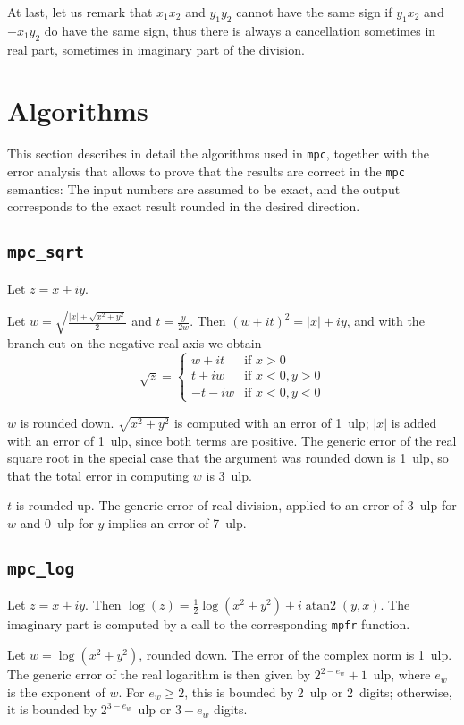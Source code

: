 \documentclass {article}
\newcommand {\mpc}{\texttt {mpc}}
\newcommand {\mpfr}{\texttt {mpfr}}
\newcommand {\ulp}[1]{#1~ulp}
\newcommand {\atantwo}{\operatorname {atan2}}
\begin{document}
At last, let us remark that $x_1x_2$ and $y_1y_2$ cannot have the same
sign if $y_1x_2$ and $-x_1y_2$ do have the same sign, thus there is
always a cancellation sometimes in real part, sometimes in imaginary
part of the division.


\section {Algorithms}

This section describes in detail the algorithms used in \mpc, together with the error analysis that allows to prove that the results are correct in the {\mpc} semantics: The input numbers are assumed to be exact, and the output corresponds to the exact result rounded in the desired direction.


\subsection {\texttt {mpc\_sqrt}}

Let $z = x + i y$.

Let $w = \sqrt { \frac {|x| + \sqrt {x^2 + y^2}}{2}}$ and
$t = \frac {y}{2w}$. Then $(w + it)^2 = |x| + iy$, and with the branch cut on the negative real axis we obtain
\[
\sqrt z = \left\{
\begin {array}{cl}
w + i t & \text {if } x > 0 \\
t + i w & \text {if } x < 0, y > 0 \\
-t - i w & \text {if } x < 0, y < 0
\end {array}
\right.
\]

$w$ is rounded down. $\sqrt {x^2 + y^2}$ is computed with an error of \ulp{1}; $|x|$ is added with an error of \ulp{1}, since both terms are positive. The generic error of the real square root in the special case that the argument was rounded down is \ulp{1}, so that the total error in computing $w$ is \ulp{3}.

$t$ is rounded up. The generic error of real division, applied to an error of \ulp{3} for $w$ and \ulp{0} for $y$ implies an error of \ulp{7}.


\subsection {\texttt {mpc\_log}}

Let $z = x + i y$. Then $\log (z) = \frac {1}{2} \log (x^2 + y^2) + i \atantwo (y, x)$. The imaginary part is computed by a call to the corresponding {\mpfr} function.

Let $w = \log (x^2 + y^2)$, rounded down. The error of the complex norm is \ulp{1}. The generic error of the real logarithm is then given by \ulp{$2^{2 - e_w} + 1$}, where $e_w$ is the exponent of $w$. For $e_w \geq 2$, this is bounded by \ulp{2} or 2~digits; otherwise, it is bounded by \ulp{$2^{3 - e_w}$} or $3 - e_w$ digits.
\end{document}
